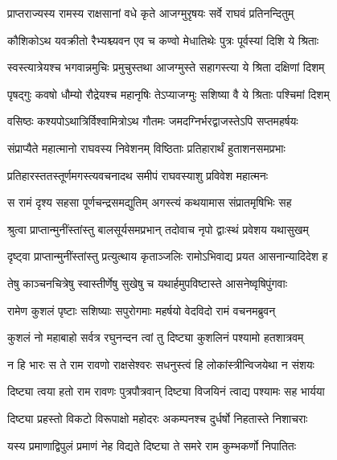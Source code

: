 

\twolineshloka
{प्राप्तराज्यस्य रामस्य राक्षसानां वधे कृते}
{आजग्मुरृषयः सर्वे राघवं प्रतिनन्दितुम्} %

\twolineshloka
{कौशिकोऽथ यवक्रीतो रैभ्यश्च्यवन एव च}
{कण्वो मेधातिथेः पुत्रः पूर्वस्यां दिशि ये श्रिताः} %

\twolineshloka
{स्वस्त्यात्रेयश्च भगवान्नमुचिः प्रमुचुस्तथा}
{आजग्मुस्ते सहागस्त्या ये श्रिता दक्षिणां दिशम्} %

\twolineshloka
{पृषद्गुः कवषो धौम्यो रौद्रेयश्च महानृषिः}
{तेऽप्याजग्मुः सशिष्या वै ये श्रिताः पश्चिमां दिशम्} %

\twolineshloka
{वसिष्ठः कश्यपोऽथात्रिर्विश्वामित्रोऽथ गौतमः}
{जमदग्निर्भरद्वाजस्तेऽपि सप्तमहर्षयः} %

\twolineshloka
{संप्राप्यैते महात्मानो राघवस्य निवेशनम्}
{विष्ठिताः प्रतिहारार्थं हुताशनसमप्रभाः} %

\twolineshloka
{प्रतिहारस्ततस्तूर्णमगस्त्यवचनादथ}
{समीपं राघवस्याशु प्रविवेश महात्मनः} %

\twolineshloka
{स रामं दृश्य सहसा पूर्णचन्द्रसमद्युतिम्}
{अगस्त्यं कथयामास संप्रातमृषिभिः सह} %

\twolineshloka
{श्रुत्वा प्राप्तान्मुनींस्तांस्तु बालसूर्यसमप्रभान्}
{तदोवाच नृपो द्वाःस्थं प्रवेशय यथासुखम्} %

\twolineshloka
{दृष्ट्वा प्राप्तान्मुनींस्तांस्तु प्रत्युत्थाय कृताञ्जलिः}
{रामोऽभिवाद्य प्रयत आसनान्यादिदेश ह} %

\twolineshloka
{तेषु काञ्चनचित्रेषु स्वास्तीर्णेषु सुखेषु च}
{यथार्हमुपविष्टास्ते आसनेष्वृषिपुंगवाः} %

\twolineshloka
{रामेण कुशलं पृष्टाः सशिष्याः सपुरोगमाः}
{महर्षयो वेदविदो रामं वचनमब्रुवन्} %

\twolineshloka
{कुशलं नो महाबाहो सर्वत्र रघुनन्दन}
{त्वां तु दिष्ट्या कुशलिनं पश्यामो हतशात्रवम्} %

\twolineshloka
{न हि भारः स ते राम रावणो राक्षसेश्वरः}
{सधनुस्त्वं हि लोकांस्त्रीन्विजयेथा न संशयः} %

\twolineshloka
{दिष्ट्या त्वया हतो राम रावणः पुत्रपौत्रवान्}
{दिष्ट्या विजयिनं त्वाद्य पश्यामः सह भार्यया} %

\twolineshloka
{दिष्ट्या प्रहस्तो विकटो विरूपाक्षो महोदरः}
{अकम्पनश्च दुर्धर्षो निहतास्ते निशाचराः} %

\twolineshloka
{यस्य प्रमाणाद्विपुलं प्रमाणं नेह विद्यते}
{दिष्ट्या ते समरे राम कुम्भकर्णो निपातितः} %

